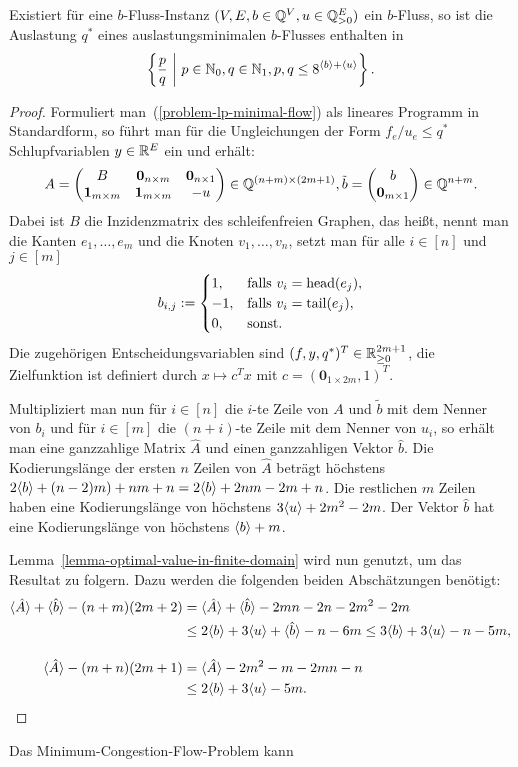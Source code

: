 \begin{corollary}
	Existiert für eine $b$-Fluss-Instanz $(V, E, b\in\mathbb{Q}^V, u\in\mathbb{Q}^E_{>0})$ ein $b$-Fluss, so ist die Auslastung $q^*$ eines auslastungsminimalen $b$-Flusses enthalten in
	\[
	\left\{ \frac{p}{q} ~\middle|~ p\in\mathbb{N}_0, q\in\mathbb{N}_1, p,q \leq 8^{\langle b\rangle + \langle u\rangle } \right\}.
	\]
\end{corollary}
\begin{proof}
	
Formuliert man~(\ref{problem-lp-minimal-flow}) als lineares Programm in Standardform, so führt man für die Ungleichungen der Form $f_e/u_e \leq q^*$ Schlupfvariablen $y\in\mathbb{R}^E$ ein und erhält:
\newcommand{\nil}{\mathbf{0}}
\newcommand{\one}{\mathbf{1}}
\[
	A = \begin{pmatrix}
		B & \nil_{n\times m} & \nil_{n\times 1} \\
		\one_{m\times m} & \one_{m\times m} & -u
	\end{pmatrix} \in \Q^{(n+m) \times (2m+1)},
	\tilde{b} = \begin{pmatrix}
		b \\
		\nil_{m\times 1}
	\end{pmatrix} \in \Q^{n+m}.
\]
Dabei ist $B$ die Inzidenzmatrix des schleifenfreien Graphen, das heißt, nennt man die Kanten $e_1, \dots, e_m $ und die Knoten $v_1, \dots, v_n$, setzt man  für alle $i\in [n]$ und $j\in [m]$
\[ 
	b_{i,j} := \begin{cases}
		1, & \text{falls $v_i = \operatorname{head}(e_j)$}, \\
		-1, & \text{falls $v_i = \operatorname{tail}(e_j)$},\\
		0, & \text{sonst.}
	\end{cases}
\]
 Die zugehörigen Entscheidungsvariablen sind $(f, y, q^*)^T\in\mathbb{R}_{\geq 0}^{2m+1}$, die Zielfunktion ist definiert durch $x\mapsto c^T x$ mit $c = (\nil_{1\times 2m}, 1)^T$.
 
Multipliziert man nun für $i\in [n]$ die $i$-te Zeile von $A$ und $\tilde{b}$ mit dem Nenner von $b_i$ und für $i\in [m]$ die $(n+i)$-te Zeile mit dem Nenner von $u_i$, so erhält man eine ganzzahlige Matrix $\hat{A}$ und einen ganzzahligen Vektor $\hat{b}$.
Die Kodierungslänge der ersten $n$ Zeilen von $\hat{A}$ beträgt höchstens $2\langle b\rangle + (n-2)m) + nm + n = 2\langle b\rangle + 2nm -2m + n$.
Die restlichen $m$ Zeilen haben eine Kodierungslänge von höchstens $3\langle u\rangle + 2m^2 - 2m$.
Der Vektor $\hat{b}$ hat eine Kodierungslänge von höchstens $\langle b\rangle + m$.

Lemma~\ref{lemma-optimal-value-in-finite-domain} wird nun genutzt, um das Resultat zu folgern.
Dazu werden die folgenden beiden Abschätzungen benötigt:
\begin{align*}
\langle\hat{A}\rangle + \langle\hat{b}\rangle - (n+m)(2m+2) &= \langle\hat{A}\rangle + \langle\hat{b}\rangle - 2mn - 2n - 2m^2 - 2m\\
&\leq 2 \langle b\rangle + 3\langle u\rangle + \langle\hat{b}\rangle - n - 6m \leq 3\langle b\rangle + 3\langle u\rangle -n-5m, \\[1em]
\langle\hat{A}\rangle - (m+n)(2m + 1) &= \langle\hat{A}\rangle - 2m^2 - m - 2mn - n\\
&\leq 2\langle b\rangle + 3\langle u\rangle - 5m.
\end{align*}
\end{proof}

\begin{theorem}
	Das Minimum-Congestion-Flow-Problem kann 
\end{theorem}